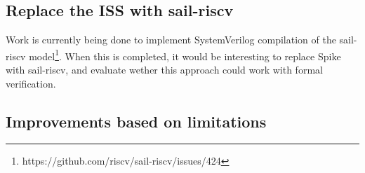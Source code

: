 \subsection{Replace the ISS with sail-riscv}

Work is currently being done to implement SystemVerilog compilation of the sail-riscv model\footnote{https://github.com/riscv/sail-riscv/issues/424}. When this is completed, it would be interesting to replace Spike with sail-riscv, and evaluate wether this approach could work with formal verification. 

\subsection{Improvements based on limitations}

